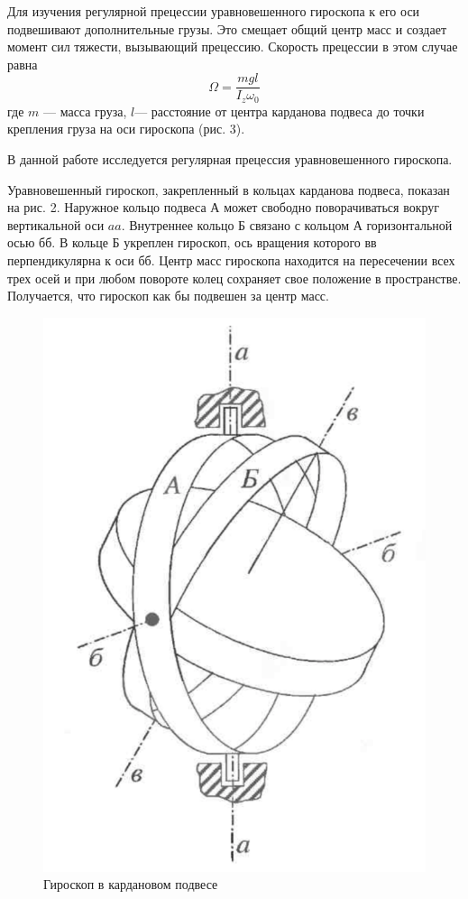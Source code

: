 \documentclass[a4paper,12pt]{article} %
\begin{document}
Для изучения регулярной прецессии уравновешенного гироскопа к его оси подвешивают дополнительные грузы. Это смещает общий центр масс и создает момент сил тяжести, вызывающий прецессию. Скорость прецессии в этом случае равна
\begin{equation}
\Omega = \frac{mgl}{I_z\omega_0}
\end{equation}
где $m$ — масса груза, $l$— расстояние от центра карданова подвеса до точки крепления груза на оси гироскопа (рис. 3).

В данной работе исследуется регулярная прецессия уравновешенного гироскопа.

Уравновешенный гироскоп, закрепленный в кольцах карданова подвеса, показан на рис. 2. Наружное кольцо подвеса $\text{А}$ может свободно поворачиваться вокруг вертикальной оси $aa$. Внутреннее кольцо $\text{Б}$ связано с кольцом $\text{А}$ горизонтальной осью $\text{бб}$. В кольце $\text{Б}$ укреплен гироскоп, ось вращения которого $\text{вв}$ перпендикулярна к оси $\text{бб}$. Центр масс гироскопа находится на пересечении всех трех осей и при любом повороте колец сохраняет свое положение в пространстве. Получается, что гироскоп как бы подвешен за центр масс.
\begin{figure}[h]
\centering
\includegraphics[scale=0.5]{2}
\caption{Гироскоп в кардановом подвесе}
\end{figure}
\end{document}
